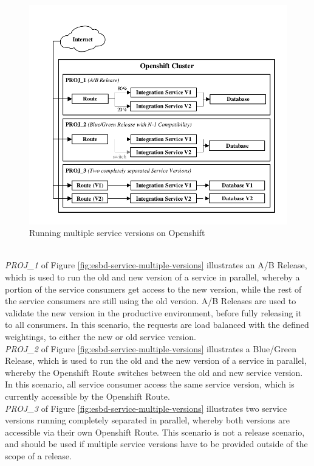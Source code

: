 \begin{figure}[htbp]
	\centering
	\includegraphics[scale=1]{images/esbd-service-multiple-versions.pdf}
	\caption{Running multiple service versions on Openshift}
	\label{fig:esbd-service-multiple-versions}
\end{figure}
\ \\
\emph{PROJ\_1} of Figure \vref{fig:esbd-service-multiple-versions} illustrates an A/B Release, which is used to run the old and new version of a service in parallel, whereby a portion of the service consumers get access to the new version, while the rest of the service consumers are still using the old version. A/B Releases are used to validate the new version in the productive environment, before fully releasing it to all consumers. In this scenario, the requests are load balanced with the defined weightings, to either the new or old service version. \\ 

\emph{PROJ\_2} of Figure \vref{fig:esbd-service-multiple-versions} illustrates a Blue/Green Release, which is used to run the old and the new version of a service in parallel, whereby the Openshift Route switches between the old and new service version. In this scenario, all service consumer access the same service version, which is currently accessible by the Openshift Route. \\

\emph{PROJ\_3} of Figure \vref{fig:esbd-service-multiple-versions} illustrates two service versions running completely separated in parallel, whereby both versions are accessible via their own Openshift Route. This scenario is not a release scenario, and should be used if multiple service versions have to be provided outside of the scope of a release. \\

